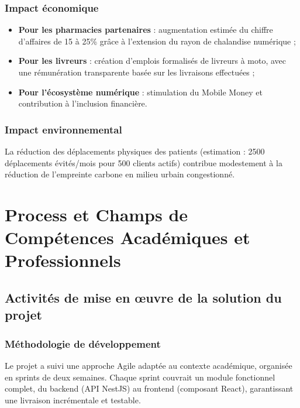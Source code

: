 \documentclass[12pt,a4paper,oneside]{report}
\begin{document}
\subsection{Impact économique}

\begin{itemize}
  \item \textbf{Pour les pharmacies partenaires} : augmentation estimée du chiffre d'affaires de 15 à 25\% grâce à l'extension du rayon de chalandise numérique ;
  \item \textbf{Pour les livreurs} : création d'emplois formalisés de livreurs à moto, avec une rémunération transparente basée sur les livraisons effectuées ;
  \item \textbf{Pour l'écosystème numérique} : stimulation du Mobile Money et contribution à l'inclusion financière.
\end{itemize}

\subsection{Impact environnemental}

La réduction des déplacements physiques des patients (estimation : 2500 déplacements évités/mois pour 500 clients actifs) contribue modestement à la réduction de l'empreinte carbone en milieu urbain congestionné.

\clearpage

\chapter{Process et Champs de Compétences Académiques et Professionnels}

\section{Activités de mise en œuvre de la solution du projet}

\subsection{Méthodologie de développement}

Le projet a suivi une approche Agile adaptée au contexte académique, organisée en sprints de deux semaines. Chaque sprint couvrait un module fonctionnel complet, du backend (API NestJS) au frontend (composant React), garantissant une livraison incrémentale et testable.
\end{document}
